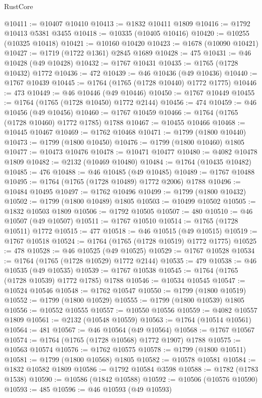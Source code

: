 \begin{lexlean}{RustCore}
\begin{coremodule}
@10411 := @10407 @10410
@10413 := @1832 @10411 @1809
@10416 := @1792 @10413 @5381 @3455
@10418 := @10335 (@10405 @10416)
@10420 := @10255 (@10325 @10418)
@10421 := @10160 @10420
@10423 := @1678 (@10090 @10421)
@10427 := @1719 (@1722 @1361) @2845 @1689
@10428 := 475
@10431 := @46 @10428 (@49 @10428)
@10432 := @1767 @10431
@10435 := @1765 (@1728 @10432) @1772
@10436 := 472
@10439 := @46 @10436 (@49 @10436)
@10440 := @1767 @10439
@10445 := @1764 (@1765 (@1728 @10440) @1772 @1775)
@10446 := 473
@10449 := @46 @10446 (@49 @10446)
@10450 := @1767 @10449
@10455 := @1764 (@1765 (@1728 @10450) @1772 @2144)
@10456 := 474
@10459 := @46 @10456 (@49 @10456)
@10460 := @1767 @10459
@10466 := @1764 (@1765 (@1728 @10460) @1772 @1785) @1788
@10467 := @10455 @10466
@10468 := @10445 @10467
@10469 := @1762 @10468
@10471 := @1799 (@1800 @10440)
@10473 := @1799 (@1800 @10450)
@10476 := @1799 (@1800 @10460) @1805
@10477 := @10473 @10476
@10478 := @10471 @10477
@10480 := @4082 @10478 @1809
@10482 := @2132 (@10469 @10480)
@10484 := @1764 (@10435 @10482)
@10485 := 476
@10488 := @46 @10485 (@49 @10485)
@10489 := @1767 @10488
@10495 := @1764 (@1765 (@1728 @10489) @1772 @2006) @1788
@10496 := @10484 @10495
@10497 := @1762 @10496
@10499 := @1799 (@1800 @10432)
@10502 := @1799 (@1800 @10489) @1805
@10503 := @10499 @10502
@10505 := @1832 @10503 @1809
@10506 := @1792 @10505
@10507 := 480
@10510 := @46 @10507 (@49 @10507)
@10511 := @1767 @10510
@10514 := @1765 (@1728 @10511) @1772
@10515 := 477
@10518 := @46 @10515 (@49 @10515)
@10519 := @1767 @10518
@10524 := @1764 (@1765 (@1728 @10519) @1772 @1775)
@10525 := 478
@10528 := @46 @10525 (@49 @10525)
@10529 := @1767 @10528
@10534 := @1764 (@1765 (@1728 @10529) @1772 @2144)
@10535 := 479
@10538 := @46 @10535 (@49 @10535)
@10539 := @1767 @10538
@10545 := @1764 (@1765 (@1728 @10539) @1772 @1785) @1788
@10546 := @10534 @10545
@10547 := @10524 @10546
@10548 := @1762 @10547
@10550 := @1799 (@1800 @10519)
@10552 := @1799 (@1800 @10529)
@10555 := @1799 (@1800 @10539) @1805
@10556 := @10552 @10555
@10557 := @10550 @10556
@10559 := @4082 @10557 @1809
@10561 := @2132 (@10548 @10559)
@10563 := @1764 (@10514 @10561)
@10564 := 481
@10567 := @46 @10564 (@49 @10564)
@10568 := @1767 @10567
@10574 := @1764 (@1765 (@1728 @10568) @1772 @1907) @1788
@10575 := @10563 @10574
@10576 := @1762 @10575
@10578 := @1799 (@1800 @10511)
@10581 := @1799 (@1800 @10568) @1805
@10582 := @10578 @10581
@10584 := @1832 @10582 @1809
@10586 := @1792 @10584 @3598
@10588 := @1782 (@1783 @1538)
@10590 := @10586 (@1842 @10588)
@10592 := @10506 (@10576 @10590)
@10593 := 485
@10596 := @46 @10593 (@49 @10593)

\end{coremodule}
\end{lexlean}
